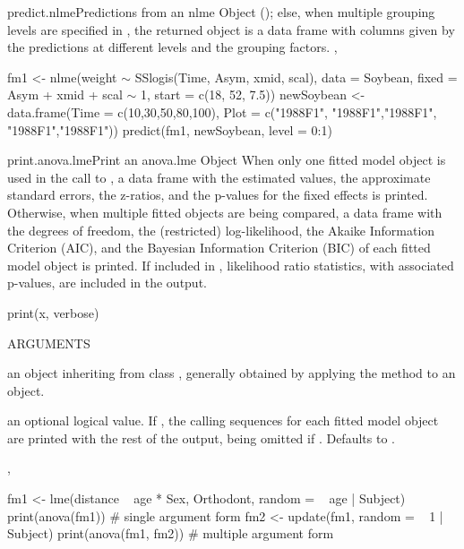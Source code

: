 \documentclass[pdftex]{article} \usepackage{url,graphicx}
\renewcommand{\Twiddle}{\mbox{\(\sim\)}}
\begin{document}
\begin{Helpfile}{predict.nlme}{Predictions from an nlme Object}
(); else, when multiple grouping levels are
specified in , the returned object is a data frame with
columns given by the predictions at different levels and the grouping
factors.
, 
\need 15pt
\vspace{-16pt}
\begin{Example}
fm1 <- nlme(weight {\Twiddle} SSlogis(Time, Asym, xmid, scal), 
            data = Soybean, fixed = Asym + xmid + scal {\Twiddle} 1, 
            start = c(18, 52, 7.5))
newSoybean <- data.frame(Time = c(10,30,50,80,100),
     Plot = c("1988F1", "1988F1","1988F1", "1988F1","1988F1"))
predict(fm1, newSoybean, level = 0:1)
\end{Example}
\end{Helpfile}
\begin{Helpfile}{print.anova.lme}{Print an anova.lme Object}
When only one fitted model object is used in the call to
, a data frame with the estimated values, the
approximate standard errors, the z-ratios, and the  p-values for the
fixed effects is printed. Otherwise, when multiple fitted objects are
being compared, a data frame with the degrees of freedom, the
(restricted) log-likelihood, the Akaike Information Criterion (AIC),
and the Bayesian Information Criterion (BIC) of each fitted model
object is printed. If included in , likelihood ratio
statistics, with associated p-values, are included in the output.
\begin{Example}
print(x, verbose)
\end{Example}
\begin{Argument}{ARGUMENTS}
\item[\Co{x:}]
an object inheriting from class ,
generally obtained by applying the  method to an
 object.
\item[\Co{verbose:}]
an optional logical value. If , the calling
sequences for each fitted model object are printed with the rest of
the output, being omitted if . Defaults to
.
\end{Argument}
, 
\need 15pt
\vspace{-16pt} 
\begin{Example}
fm1 <- lme(distance ~ age * Sex, Orthodont, random = ~ age | Subject)
print(anova(fm1))           # single argument form
fm2 <- update(fm1, random = ~ 1 | Subject)
print(anova(fm1, fm2))      # multiple argument form
\end{Example}
\end{Helpfile}
\end{document}
